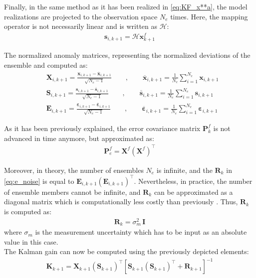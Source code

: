 \documentclass[12pt,twoside]{report}
\begin{document}
Finally, in the same method as it has been realized in \autoref{eq:KF_x**a}, the model realizations are projected to the observation space $N_e$ times. Here, the mapping operator is not necessarily linear and is written as $\mathcal{H}$:
\begin{align}
    \mathbf{s}_{i,k+1} = \mathcal{H} \mathbf{x}_{k+1}^f 
\end{align}

The normalized anomaly matrices, representing the normalized deviations of the ensemble and computed as:
\begin{align}
    &\mathbf{X}_{i,k+1} = \frac{\mathbf{x}_{i,k+1} - \overline{\mathbf{x}}_{i,k+1}}{\sqrt{N_e - 1}} \qquad , \qquad \overline{\mathbf{x}}_{i,k+1} = \frac{1}{N_e} \sum_{i=1}^{N_e} \mathbf{x}_{i,k+1} \\
    &\mathbf{S}_{i,k+1} = \frac{\mathbf{s}_{i,k+1} - \overline{\mathbf{s}}_{i,k+1}}{\sqrt{N_e - 1}} \qquad , \qquad \overline{\mathbf{s}}_{i,k+1} = \frac{1}{N_e} \sum_{i=1}^{N_e} \mathbf{s}_{i,k+1} \\
    &\mathbf{E}_{i,k+1} = \frac{\bm{\varepsilon}_{i,k+1} - \overline{\bm{\varepsilon}}_{i,k+1}}{\sqrt{N_e - 1}} \qquad , \qquad \overline{\bm{\varepsilon}}_{i,k+1} = \frac{1}{N_e} \sum_{i=1}^{N_e} \bm{\varepsilon}_{i,k+1}
\end{align}

As it has been previously explained, the error covariance matrix $\mathbf{P}_k^f$ is not advanced in time anymore, but approximated as:
\begin{align}
    \mathbf{P}_e^f = \mathbf{X}^f \left( \mathbf{X}^f \right)^{\top}
\end{align}

Moreover, in theory, the number of ensembles $N_e$ is infinite, and the $\mathbf{R}_k$ in \autoref{eq:e_noise} is equal to $\mathbf{E}_{i,k+1} \left( \mathbf{E}_{i,k+1}\right)^{\top}$. Nevertheless, in practice, the number of ensemble members cannot be infinite, and $\mathbf{R}_k$ can be approximated as a diagonal matrix which is computationally less costly than previously \citep[see][Sec. 4.1.4]{carrassi_data_2018}. Thus, $\mathbf{R}_k$ is computed as:
\begin{align}
    \mathbf{R}_k = \sigma_m^2 \, \mathbf{I}
\end{align}
where $\sigma_m$ is the measurement uncertainty which has to be input as an absolute value in this case. \\
The Kalman gain can now be computed using the previously depicted elements:
\begin{align}
    \mathbf{K}_{k+1} = \mathbf{X}_{k+1} \left( \mathbf{S}_{k+1} \right)^{\top} \left[  \mathbf{S}_{k+1} \left( \mathbf{S}_{k+1} \right)^{\top} + \mathbf{R}_{k+1} \right] ^{-1}
\end{align}
\end{document}
